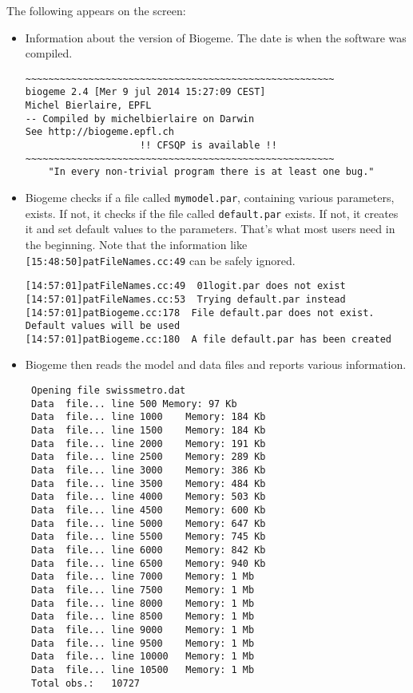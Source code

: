 \documentclass[12pt]{memoir}
\begin{document}
The following appears on the screen:
\begin{itemize}
\item Information about the version of Biogeme. The date is when the
software was compiled. 

{\footnotesize
\begin{verbatim}
~~~~~~~~~~~~~~~~~~~~~~~~~~~~~~~~~~~~~~~~~~~~~~~~~~~~~~
biogeme 2.4 [Mer 9 jul 2014 15:27:09 CEST]
Michel Bierlaire, EPFL
-- Compiled by michelbierlaire on Darwin
See http://biogeme.epfl.ch
                    !! CFSQP is available !!
~~~~~~~~~~~~~~~~~~~~~~~~~~~~~~~~~~~~~~~~~~~~~~~~~~~~~~
	"In every non-trivial program there is at least one bug."
\end{verbatim}
}
\item Biogeme checks if a file called \texttt{mymodel.par},
containing various parameters, exists. If not, it checks if the file
called \texttt{default.par} exists. If not, it creates it and set
default values to the parameters. That's what most users need in the
beginning. Note that the information like
\texttt{[15:48:50]patFileNames.cc:49} can be safely ignored.
{\footnotesize
\begin{verbatim}
[14:57:01]patFileNames.cc:49  01logit.par does not exist
[14:57:01]patFileNames.cc:53  Trying default.par instead
[14:57:01]patBiogeme.cc:178  File default.par does not exist. Default values will be used
[14:57:01]patBiogeme.cc:180  A file default.par has been created
\end{verbatim}
}
\item  Biogeme then reads the model and data files and reports various information.
{\footnotesize
\begin{verbatim}
 Opening file swissmetro.dat
 Data  file... line 500	Memory: 97 Kb
 Data  file... line 1000	Memory: 184 Kb
 Data  file... line 1500	Memory: 184 Kb
 Data  file... line 2000	Memory: 191 Kb
 Data  file... line 2500	Memory: 289 Kb
 Data  file... line 3000	Memory: 386 Kb
 Data  file... line 3500	Memory: 484 Kb
 Data  file... line 4000	Memory: 503 Kb
 Data  file... line 4500	Memory: 600 Kb
 Data  file... line 5000	Memory: 647 Kb
 Data  file... line 5500	Memory: 745 Kb
 Data  file... line 6000	Memory: 842 Kb
 Data  file... line 6500	Memory: 940 Kb
 Data  file... line 7000	Memory: 1 Mb
 Data  file... line 7500	Memory: 1 Mb
 Data  file... line 8000	Memory: 1 Mb
 Data  file... line 8500	Memory: 1 Mb
 Data  file... line 9000	Memory: 1 Mb
 Data  file... line 9500	Memory: 1 Mb
 Data  file... line 10000	Memory: 1 Mb
 Data  file... line 10500	Memory: 1 Mb
 Total obs.:   10727

\end{verbatim}}
\end{itemize}
\end{document}
